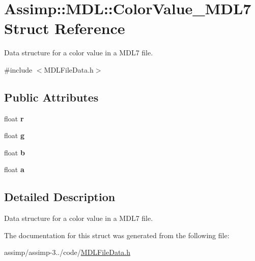 \hypertarget{struct_assimp_1_1_m_d_l_1_1_color_value___m_d_l7}{\section{Assimp\+:\+:M\+D\+L\+:\+:Color\+Value\+\_\+\+M\+D\+L7 Struct Reference}
\label{struct_assimp_1_1_m_d_l_1_1_color_value___m_d_l7}
}


Data structure for a color value in a M\+D\+L7 file.  




{\ttfamily \#include $<$M\+D\+L\+File\+Data.\+h$>$}

\subsection*{Public Attributes}
\begin{DoxyCompactItemize}
\item 
\hypertarget{struct_assimp_1_1_m_d_l_1_1_color_value___m_d_l7_a3f63d096aa3a20e97b571011e13496b2}{float {\bfseries r}}\label{struct_assimp_1_1_m_d_l_1_1_color_value___m_d_l7_a3f63d096aa3a20e97b571011e13496b2}

\item 
\hypertarget{struct_assimp_1_1_m_d_l_1_1_color_value___m_d_l7_a8e00f6aa5ade876fd44a3e0c52d1b978}{float {\bfseries g}}\label{struct_assimp_1_1_m_d_l_1_1_color_value___m_d_l7_a8e00f6aa5ade876fd44a3e0c52d1b978}

\item 
\hypertarget{struct_assimp_1_1_m_d_l_1_1_color_value___m_d_l7_af4b3d878002a819d3f8319369f7ab910}{float {\bfseries b}}\label{struct_assimp_1_1_m_d_l_1_1_color_value___m_d_l7_af4b3d878002a819d3f8319369f7ab910}

\item 
\hypertarget{struct_assimp_1_1_m_d_l_1_1_color_value___m_d_l7_ae0c74b6732c7da4af71dc2cf8993ebe5}{float {\bfseries a}}\label{struct_assimp_1_1_m_d_l_1_1_color_value___m_d_l7_ae0c74b6732c7da4af71dc2cf8993ebe5}

\end{DoxyCompactItemize}


\subsection{Detailed Description}
Data structure for a color value in a M\+D\+L7 file. 

The documentation for this struct was generated from the following file\+:\begin{DoxyCompactItemize}
\item 
assimp/assimp-\/3../code/\hyperlink{_m_d_l_file_data_8h}{M\+D\+L\+File\+Data.\+h}\end{DoxyCompactItemize}
